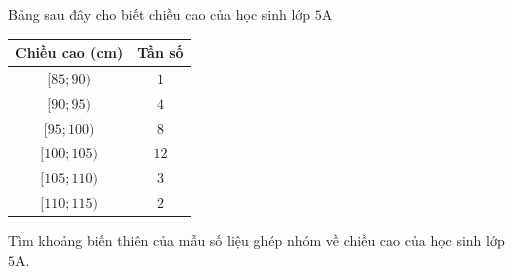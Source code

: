 \begin{bt}%
	Bảng sau đây cho biết chiều cao của học sinh lớp $5$A
	\begin{center}
		\begin{tabular}{|c|c|}
			\hline
			Chiều cao (cm) & Tần số \\
			\hline
			$[85;90)$ & $1$\\
			\hline
			$[90;95)$ & $4$\\
			\hline
			$[95;100)$ & $8$\\
			\hline
			$[100;105)$ & $12$\\
			\hline
			$[105;110)$ & $3$\\
			\hline
			$[110;115)$ & $2$\\
			\hline
		\end{tabular}
	\end{center}
	Tìm khoảng biến thiên của mẫu số liệu ghép nhóm về chiều cao của học sinh lớp $5$A.
\end{bt}

